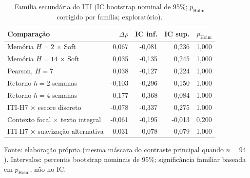 \begin{table}[htbp]
\centering
\caption{Família secundária do ITI (IC bootstrap nominal de 95\%; $p_{\mathrm{Holm}}$ corrigido por família; exploratório).}
\label{tab:iti-secondary}
\begin{tabularx}{\textwidth}{@{}Lrrrr@{}}
\toprule
Comparação & $\Delta\rho$ & IC inf. & IC sup. & $p_{\mathrm{Holm}}$ \\
\midrule
Memória $H=2$ × Soft & 0,067 & -0,081 & 0,236 & 1,000 \\
Memória $H=14$ × Soft & 0,035 & -0,135 & 0,245 & 1,000 \\
Pearson, $H=7$ & 0,038 & -0,127 & 0,224 & 1,000 \\
Retorno $h=2$ semanas & -0,103 & -0,296 & 0,150 & 1,000 \\
Retorno $h=4$ semanas & -0,177 & -0,368 & 0,084 & 1,000 \\
ITI-H7 × escore discreto & -0,078 & -0,337 & 0,275 & 1,000 \\
Contexto focal × texto integral & -0,061 & -0,195 & -0,013 & 0,200 \\
ITI-H7 × suavização alternativa & -0,031 & -0,078 & 0,079 & 1,000 \\
\bottomrule
\end{tabularx}
\vspace{0.4em}
{\footnotesize Fonte: elaboração própria (mesma máscara do contraste principal quando $n=94$). Intervalos: percentis bootstrap nominais de 95\%; significância familiar baseada em $p_{\mathrm{Holm}}$, não no IC.}
\end{table}
